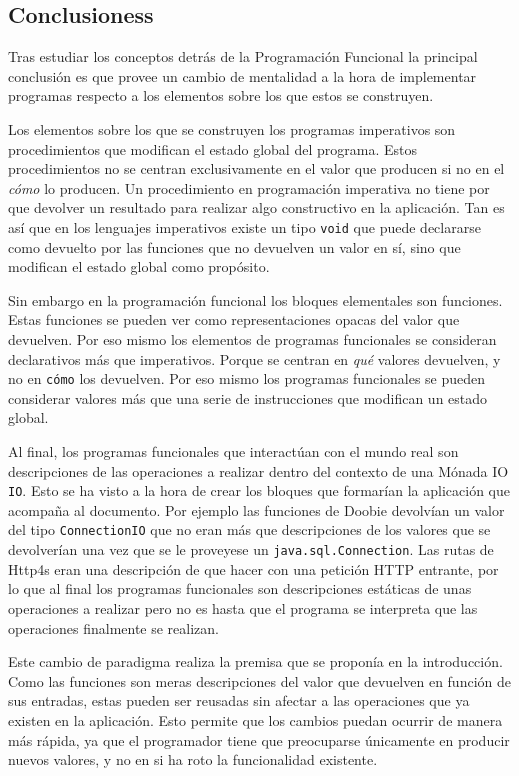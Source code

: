\documentclass[../main.tex]{subfiles}
\begin{document}
\subsection{Conclusioness}
Tras estudiar los conceptos detrás de la Programación Funcional la principal
conclusión es que provee un cambio de mentalidad a la hora de implementar programas
respecto a los elementos sobre los que estos se construyen.

Los elementos sobre los que se construyen los programas imperativos son procedimientos
que modifican el estado global del programa. Estos procedimientos no se centran exclusivamente
en el valor que producen si no en el \textit{cómo} lo producen. Un procedimiento en programación
imperativa no tiene por que devolver un resultado para realizar algo constructivo en la aplicación.
Tan es así que en los lenguajes imperativos existe un tipo \texttt{void} que puede declararse
como devuelto por las funciones que no devuelven un valor en sí, sino que modifican el estado global
como propósito.

Sin embargo en la programación funcional los bloques elementales son funciones. Estas
funciones se pueden ver como representaciones opacas del valor que devuelven. Por eso
mismo los elementos de programas funcionales se consideran declarativos más que imperativos.
Porque se centran en \textit{qué} valores devuelven, y no en \texttt{cómo} los devuelven.
Por eso mismo los programas funcionales se pueden considerar valores más que una serie de
instrucciones que modifican un estado global.

Al final, los programas funcionales que interactúan con el mundo real son descripciones de
las operaciones a realizar dentro del contexto de una Mónada IO \texttt{IO}. Esto se ha visto
a la hora de crear los bloques que formarían la aplicación que acompaña al documento. Por ejemplo
las funciones de Doobie devolvían un valor del tipo \texttt{ConnectionIO} que no eran más que
descripciones de los valores que se devolverían una vez que se le proveyese un \texttt{java.sql.Connection}.
Las rutas de Http4s eran una descripción de que hacer con una petición HTTP entrante, por lo que al
final los programas funcionales son descripciones estáticas de unas operaciones a realizar pero
no es hasta que el programa se interpreta que las operaciones finalmente se realizan.

Este cambio de paradigma realiza la premisa que se proponía en la introducción. Como las
funciones son meras descripciones del valor que devuelven en función de sus entradas, estas
pueden ser reusadas sin afectar a las operaciones que ya existen en la aplicación. Esto permite
que los cambios puedan ocurrir de manera más rápida, ya que el programador tiene que preocuparse
únicamente en producir nuevos valores, y no en si ha roto la funcionalidad existente.
\end{document}
